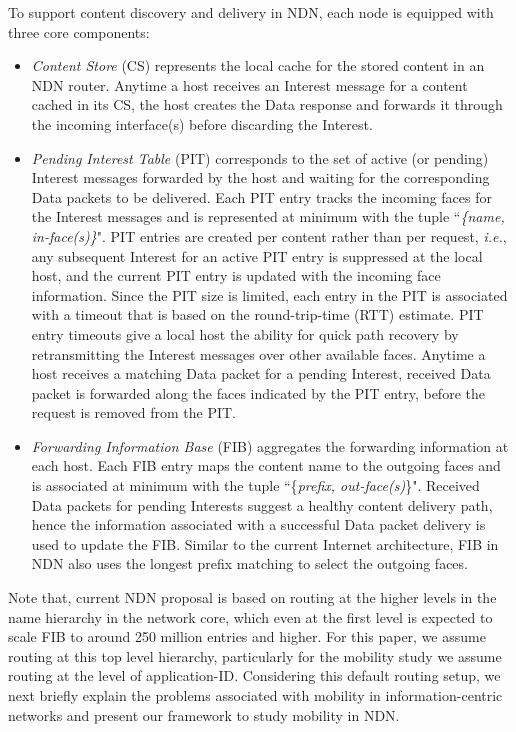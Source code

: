 \documentclass[conference]{IEEEtran}
\begin{document}
To support content discovery and delivery in NDN, each node is equipped with three core components:
\begin{itemize}
    \item \emph{Content Store} (CS) represents the local cache for the stored content in an NDN router. Anytime a host receives an Interest message for a content cached in its CS, the host creates the Data response and forwards it through the incoming interface(s) before discarding the Interest.
    \item \emph{Pending Interest Table} (PIT) corresponds to the set of active (or pending) Interest messages forwarded by the host and waiting for the corresponding Data packets to be delivered. Each PIT entry tracks the incoming faces for the Interest messages and is represented at minimum with the tuple ``\emph{\{name, in-face(s)\}}". PIT entries are created per content rather than per request, \emph{i.e.}, any subsequent Interest for an active PIT entry is suppressed at the local host, and the current PIT entry is updated with the incoming face information. Since the PIT size is limited, each entry in the PIT is associated with a timeout that is based on the round-trip-time (RTT) estimate. PIT entry timeouts give a local host the ability for quick path recovery by retransmitting the Interest messages over other available faces. Anytime a host receives a matching Data packet for a pending Interest, received Data packet is forwarded along the faces indicated by the PIT entry, before the request is removed from the PIT.
    \item \emph{Forwarding Information Base} (FIB) aggregates the forwarding information at each host. Each FIB entry maps the content name to the outgoing faces and is associated at minimum with the tuple ``\{\emph{prefix, out-face(s)}\}". Received Data packets for pending Interests suggest a healthy content delivery path, hence the information associated with a successful Data packet delivery is used to update the FIB. Similar to the current Internet architecture, FIB in NDN also uses the longest prefix matching to select the outgoing faces.
\end{itemize}

Note that, current NDN proposal is based on routing at the higher levels in the name hierarchy in the network core, which even at the first level is expected to scale FIB to around 250 million entries and higher. For this paper, we assume routing at this top level hierarchy, particularly for the mobility study we assume routing at the level of application-ID. Considering this default routing setup, we next briefly explain the problems associated with mobility in information-centric networks and present our framework to study mobility in NDN.
\end{document}
